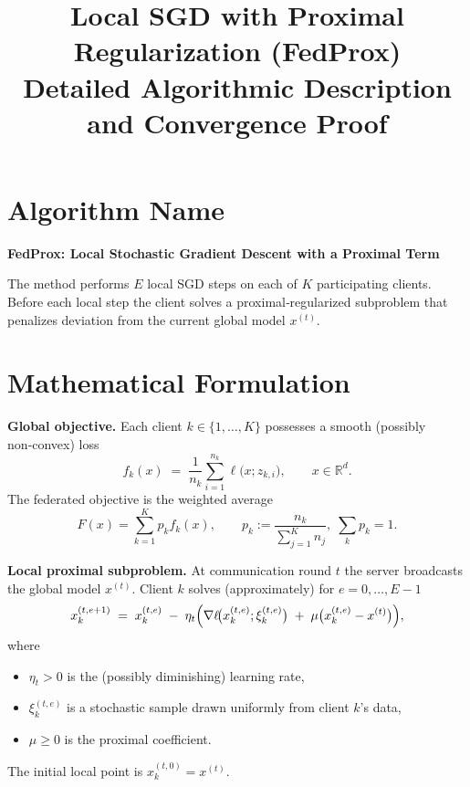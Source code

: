 \documentclass{article}
\newcommand{\R}{\mathbb{R}}
\begin{document}
\title{Local SGD with Proximal Regularization (FedProx) \\ Detailed Algorithmic Description and Convergence Proof}
\author{}
\date{}
\maketitle

\section*{Algorithm Name}
\textbf{FedProx: Local Stochastic Gradient Descent with a Proximal Term}  

The method performs $E$ local SGD steps on each of $K$ participating clients.  
Before each local step the client solves a proximal‐regularized subproblem that
penalizes deviation from the current global model $x^{(t)}$.

\section*{Mathematical Formulation}
\noindent
\textbf{Global objective.}  
Each client $k\in\{1,\dots,K\}$ possesses a smooth (possibly non‑convex) loss
\[
f_k(x)\;=\;\frac{1}{n_k}\sum_{i=1}^{n_k} \ell\!\bigl(x;z_{k,i}\bigr),\qquad 
x\in\R^d .
\]
The federated objective is the weighted average
\[
F(x)=\sum_{k=1}^{K}p_k f_k(x),\qquad p_k:=\frac{n_k}{\sum_{j=1}^{K}n_j},\;
\sum_k p_k =1 .
\]

\medskip
\textbf{Local proximal subproblem.}  
At communication round $t$ the server broadcasts the global model $x^{(t)}$.
Client $k$ solves (approximately) for $e=0,\dots,E-1$
\begin{equation}
\label{eq:local_update}
x_{k}^{(t,e+1)} \;=\;
x_{k}^{(t,e)} \;-\;\eta_{t}\Bigl(\nabla \ell\!\bigl(x_{k}^{(t,e)}; \xi_{k}^{(t,e)}\bigr)
\;+\;\mu\bigl(x_{k}^{(t,e)}-x^{(t)}\bigr)\Bigr),
\end{equation}
where
\begin{itemize}
    \item $\eta_{t}>0$ is the (possibly diminishing) learning rate,
    \item $\xi_{k}^{(t,e)}$ is a stochastic sample drawn uniformly from client $k$’s data,
    \item $\mu\ge0$ is the proximal coefficient.
\end{itemize}
The initial local point is $x_{k}^{(t,0)}=x^{(t)}$.
\end{document}
